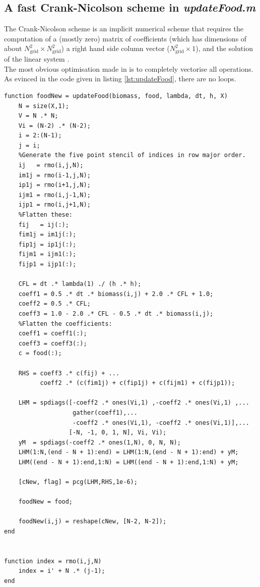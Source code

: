 \subsection{A fast Crank-Nicolson scheme in \textit{updateFood.m}}\label{ssec:updateFood}
The Crank-Nicolson scheme is an implicit numerical scheme that requires the 
computation of a (mostly zero) matrix of coefficients  (which has 
dimensions of about $N_{\textrm{grid}}^2 \times N_{\textrm{grid}}^2$)
a right hand side column vector  ($N_{\textrm{grid}}^2 \times 1$), and the 
solution of the linear system 
. 
\\

The most obvious optimisation made in  
is to completely vectorise all operations. As evinced in the code given in 
listing \ref{lst:updateFood}, there are no  loops.

\begin{lstlisting}[style=Matlab-editor,basicstyle=\lstconsolas,basicstyle=\small,  
                   caption={A code listing for the \textbf{updateFood.m} script. The variable
                   name \textbf{CFL} refers to the Courant–Friedrichs–Lewy number 
                   which comes up in numerical schemes. This is called $\alpha$ in 
                   Chapter 2.},
                   label={lst:updateFood}]
function foodNew = updateFood(biomass, food, lambda, dt, h, X)
    N = size(X,1);
    V = N .* N;
    Vi = (N-2) .* (N-2);
    i = 2:(N-1);
    j = i;  
    %Generate the five point stencil of indices in row major order.
    ij   = rmo(i,j,N);
    im1j = rmo(i-1,j,N);
    ip1j = rmo(i+1,j,N);
    ijm1 = rmo(i,j-1,N);
    ijp1 = rmo(i,j+1,N);
    %Flatten these:
    fij   = ij(:);
    fim1j = im1j(:);
    fip1j = ip1j(:);
    fijm1 = ijm1(:);
    fijp1 = ijp1(:);

    CFL = dt .* lambda(1) ./ (h .* h);
    coeff1 = 0.5 .* dt .* biomass(i,j) + 2.0 .* CFL + 1.0;
    coeff2 = 0.5 .* CFL;
    coeff3 = 1.0 - 2.0 .* CFL - 0.5 .* dt .* biomass(i,j);
    %Flatten the coefficients:
    coeff1 = coeff1(:);
    coeff3 = coeff3(:);
    c = food(:);

    RHS = coeff3 .* c(fij) + ...
          coeff2 .* (c(fim1j) + c(fip1j) + c(fijm1) + c(fijp1));

    LHM = spdiags([-coeff2 .* ones(Vi,1) ,-coeff2 .* ones(Vi,1) ,...
                   gather(coeff1),...
                   -coeff2 .* ones(Vi,1), -coeff2 .* ones(Vi,1)],...
                  [-N, -1, 0, 1, N], Vi, Vi);
    yM  = spdiags(-coeff2 .* ones(1,N), 0, N, N);
    LHM(1:N,(end - N + 1):end) = LHM(1:N,(end - N + 1):end) + yM;
    LHM((end - N + 1):end,1:N) = LHM((end - N + 1):end,1:N) + yM;

    [cNew, flag] = pcg(LHM,RHS,1e-6);

    foodNew = food;

    foodNew(i,j) = reshape(cNew, [N-2, N-2]);
end


function index = rmo(i,j,N)
    index = i' + N .* (j-1);
end
\end{lstlisting}

